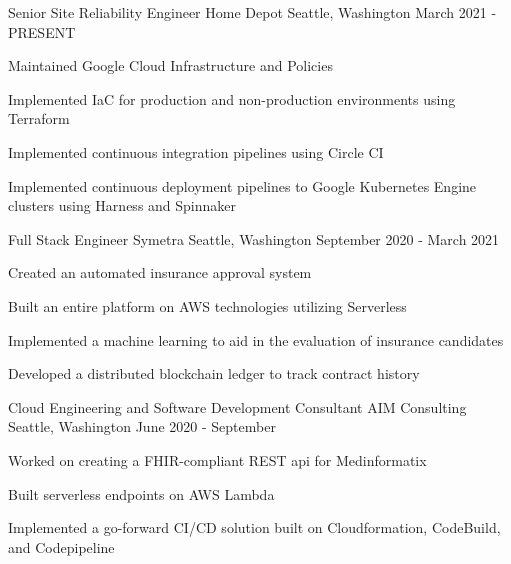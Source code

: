 


\begin{cventries}


\cventry
{Senior Site Reliability Engineer} %
{Home Depot} %
{Seattle, Washington} %
{March 2021 - PRESENT} %
{ %
\begin{cvitems}
\item {Maintained Google Cloud Infrastructure and Policies}
\item {Implemented IaC for production and non-production environments using Terraform}
\item {Implemented continuous integration pipelines using Circle CI}
\item {Implemented continuous deployment pipelines to Google Kubernetes Engine clusters using Harness and Spinnaker}
\end{cvitems}
}


\cventry
{Full Stack Engineer} %
{Symetra} %
{Seattle, Washington} %
{September 2020 - March 2021} %
{ %
\begin{cvitems}
\item {Created an automated insurance approval system}
\item {Built an entire platform on AWS technologies utilizing Serverless}
\item {Implemented a machine learning to aid in the evaluation of insurance candidates}
\item {Developed a distributed blockchain ledger to track contract history}
\end{cvitems}
}


\cventry
{Cloud Engineering and Software Development Consultant} %
{AIM Consulting} %
{Seattle, Washington} %
{June 2020 - September} %
{ %
\begin{cvitems}
\item {Worked on creating a FHIR-compliant REST api for Medinformatix}
\item {Built serverless endpoints on AWS Lambda}
\item {Implemented a go-forward CI/CD solution built on Cloudformation, CodeBuild, and Codepipeline}
\end{cvitems}
}


\end{cventries}
